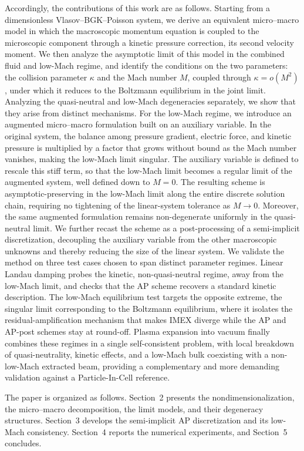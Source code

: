 \documentclass[pdflatex,final,10pt]{article}
\begin{document}
Accordingly, the contributions of this work are as follows. Starting from a dimensionless Vlasov--BGK--Poisson system, we derive an equivalent micro--macro model in which the macroscopic momentum equation is coupled to the microscopic component through a kinetic pressure correction, its second velocity moment. We then analyze the asymptotic limit of this model in the combined fluid and low-Mach regime, and identify the conditions on the two parameters: the collision parameter $\kappa$ and the Mach number $M$, coupled through $\kappa = o(M^2)$, under which it reduces to the Boltzmann equilibrium in the joint limit. Analyzing the quasi-neutral and low-Mach degeneracies separately, we show that they arise from distinct mechanisms. %
For the low-Mach regime, we introduce an augmented micro--macro formulation built on an auxiliary variable. In the original system, the balance among pressure gradient, electric force, and kinetic pressure is multiplied by a factor that grows without bound as the Mach number vanishes, making the low-Mach limit singular. The auxiliary variable is defined to rescale this stiff term, so that the low-Mach limit becomes a regular limit of the augmented system, well defined down to $M = 0$. %
The resulting scheme is asymptotic-preserving in the low-Mach limit along the entire discrete solution chain, requiring no tightening of the linear-system tolerance as $M \to 0$. Moreover, the same augmented formulation remains non-degenerate uniformly in the quasi-neutral limit. We further recast the scheme as a post-processing of a semi-implicit discretization, decoupling the auxiliary variable from the other macroscopic unknowns and thereby reducing the size of the linear system. We validate the method on three test cases chosen to span distinct parameter regimes. Linear Landau damping probes the kinetic, non-quasi-neutral regime, away from the
low-Mach limit, and checks that the AP scheme recovers a standard kinetic description. The low-Mach equilibrium test targets the opposite extreme, the singular limit corresponding to the Boltzmann equilibrium, where it isolates the residual-amplification mechanism that makes IMEX diverge while the AP and AP-post schemes stay at round-off. Plasma expansion into vacuum finally combines these regimes in a single self-consistent problem, with local breakdown of quasi-neutrality, kinetic effects, and a low-Mach bulk coexisting with a non-low-Mach extracted beam, providing a complementary and more demanding validation against a Particle-In-Cell reference.


The paper is organized as follows. Section~2 presents the nondimensionalization,
the micro--macro decomposition, the limit models, and their degeneracy
structures. Section~3 develops the semi-implicit AP discretization and its
low-Mach consistency. Section~4 reports the numerical experiments, and
Section~5 concludes.
\end{document}

